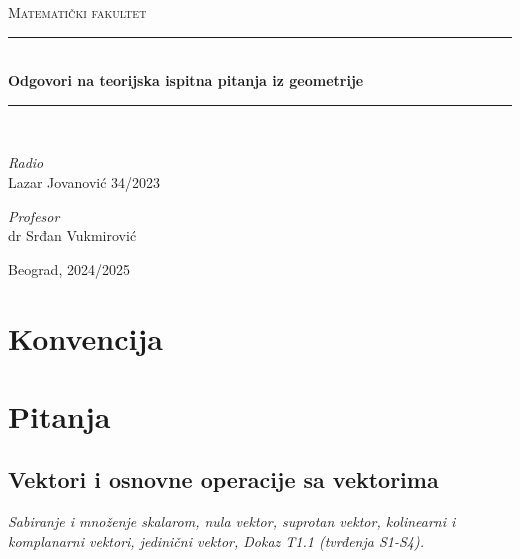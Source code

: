 \documentclass[12pt]{article}
\begin{document}
\begin{titlepage}

    \newcommand{\HRule}{\rule{\linewidth}{0.4mm}}
    \center
    \textsc{\LARGE Matematički fakultet}\\[5cm]

    \HRule\\[0.4cm]
    {\LARGE\bfseries Odgovori na teorijska ispitna pitanja iz geometrije}\\[0.2cm]
    \HRule\\[2cm]

    \vspace{17\baselineskip}
    \begin{minipage}[t]{0.4\textwidth}
        \begin{flushleft}
            \large
            \textit{Radio}\\
            Lazar Jovanović 34/2023
        \end{flushleft}
    \end{minipage}
    \hspace*{1cm}
    \begin{minipage}[t]{0.4\textwidth}
        \begin{flushright}
            \large
            \textit{Profesor}\\
            dr Srđan Vukmirović
        \end{flushright}
    \end{minipage}

    \vfill\vfill\vfill\vfill
    {\large Beograd, 2024/2025}
    \vfill

\end{titlepage}

\tableofcontents
\newpage

\section{Konvencija}

\newpage

\section{Pitanja}
\subsection{Vektori i osnovne operacije sa vektorima}
\textit{Sabiranje i množenje skalarom, nula vektor, suprotan vektor, kolinearni
    i komplanarni vektori, jedinični vektor, Dokaz T1.1 (tvrđenja S1-S4).}
\par
\vspace*{1cm}
\end{document}
